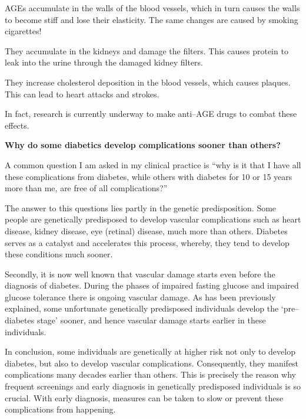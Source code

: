 {\item AGEs accumulate in the walls of the blood vessels, which in turn causes the walls to become stiff and lose their elasticity. The same changes are caused by smoking cigarettes!

 \item They accumulate in the kidneys and damage the filters. This causes protein to leak into the urine through the damaged kidney filters.

 \item They increase cholesterol deposition in the blood vessels, which causes plaques. This can lead to heart attacks and strokes.

In fact, research is currently underway to make anti–AGE drugs to combat these effects. 

\textbf{Why do some diabetics develop complications sooner than others?}

A common question I am asked in my clinical practice is “why is it that I have all these complications from diabetes, while others with diabetes for 10 or 15 years more than me, are free of all complications?”

The answer to this questions lies partly in the genetic predisposition. Some people are genetically predisposed to develop vascular complications such as heart disease, kidney disease, eye (retinal) disease, much more than others. Diabetes serves as a catalyst and accelerates this process, whereby, they tend to develop these conditions much sooner.

Secondly, it is now well known that vascular damage starts even before the diagnosis of diabetes. During the phases of impaired fasting glucose and impaired glucose tolerance there is ongoing vascular damage. As has been previously explained, some unfortunate genetically predisposed individuals develop the ‘pre–diabetes stage’ sooner, and hence vascular damage starts earlier in these individuals.

In conclusion, some individuals are genetically at higher risk not only to develop diabetes, but also to develop vascular complications. Consequently, they manifest complications many decades earlier than others. This is precisely the reason why frequent screenings and early diagnosis in genetically predisposed individuals is so crucial. With early diagnosis, measures can be taken to slow or prevent these complications from happening.

}
